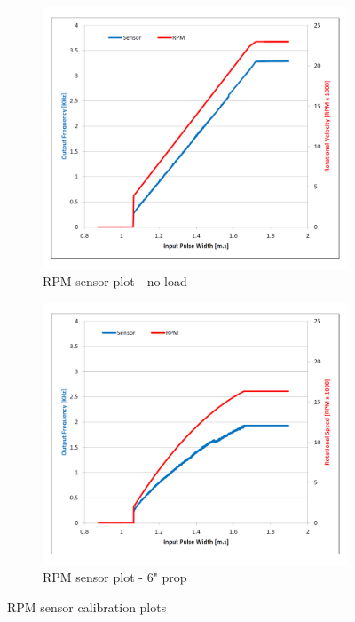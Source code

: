 \newpage
\begin{figure}[htbp]
\begin{subfigure}{0.5\textwidth}
\centering
\includegraphics[width=\textwidth]{graphs/rpm-sensor-noload}
\caption{RPM sensor plot - no load}
\label{fig:rpm-sensor-noload}
\end{subfigure}
\begin{subfigure}{0.5\textwidth}
\centering
\includegraphics[width=\textwidth]{graphs/rpm-sensor-prop}
\caption{RPM sensor plot - 6" prop}
\label{fig:rpm-sensor-prop}
\end{subfigure}
\caption{RPM sensor calibration plots}
\label{fig:rpm-sensor}
\end{figure}
